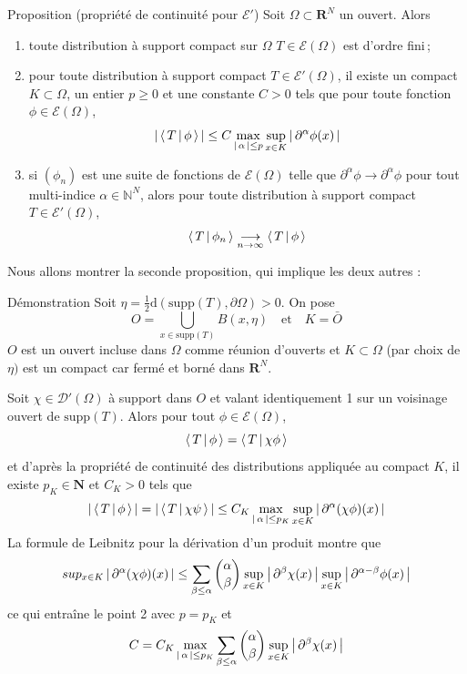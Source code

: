         \begin{omed}{Proposition (propriété de continuité pour $\mathcal{E}'$)}
            Soit $\Omega \subset \mathbf{R}^N$ un ouvert. Alors 
            \begin{enumerate}[label=($p_{\arabic*}$)]
                \item toute distribution à support compact sur $\Omega$ $T \in \mathcal{E}(\Omega)$ est d’ordre fini ;
                \item pour toute distribution à support compact $T \in \mathcal{E}'(\Omega)$, il existe un compact $K \subset \Omega$, un entier $p \geq 0$ et une constante $C > 0$ tels que pour toute fonction $\phi \in \mathcal{E}(\Omega)$, 
                \[ \left\lvert \, \left< \, T \, \middle| \, \phi \, \right> \, \right\rvert \leq C \max_{\left\lvert \, \alpha \, \right\rvert \leq p} \sup_{x \in K} \left\lvert \, \partial^{\alpha} \phi(x) \, \right\rvert \] 
                \item si $(\phi_n)$ est une suite de fonctions de $\mathcal{E}(\Omega)$ telle que $\partial^{\alpha} \phi \to \partial^{\alpha} \phi$ pour tout multi-indice $\alpha \in \mathbb{N}^N$, alors pour toute distribution à support compact $T \in \mathcal{E}'(\Omega)$, 
                \[ \left< \, T \, \middle| \, \phi_n \, \right> \underset{n \to \infty}{\longrightarrow} \left< \, T \, \middle| \, \phi \, \right> \]   
            \end{enumerate}
        \end{omed}

        Nous allons montrer la seconde proposition, qui implique les deux autres : 

        \begin{demo}{Démonstration}
            Soit $\eta = \frac{1}{2} \text{d}\left(\text{supp}(T), \partial \Omega\right) > 0$. On pose 
            \[ O = \bigcup_{x \in \text{supp}(T)} B(x, \eta) \quad \text{et} \quad K = \bar{O} \]   
            $O$ est un ouvert incluse dans $\Omega$ comme réunion d’ouverts et $K \subset \Omega$ (par choix de $\eta)$ est un compact car fermé et borné dans $\mathbf{R}^N$. 

            Soit $\chi \in \mathcal{D}'(\Omega)$ à support dans $O$ et valant identiquement 1 sur un voisinage ouvert de $\text{supp}(T)$. Alors pour tout $\phi \in \mathcal{E}(\Omega)$, 
            \[ \left< \, T \, \middle| \, \phi \, \right> = \left< \, T \, \middle| \, \chi\phi \, \right> \]   
            et d’après la propriété de continuité des distributions appliquée au compact $K$, il existe $p_K \in \mathbf{N}$ et $C_K > 0$ tels que 
            \[ \left\lvert \, \left< \, T \, \middle| \, \phi \, \right> \, \right\rvert = \left\lvert \, \left< \, T \, \middle| \, \chi\psi \, \right> \, \right\rvert \leq C_K \max_{\left\lvert \, \alpha \, \right\rvert \leq p_K} \sup_{x \in K} \left\lvert \, \partial^{\alpha} (\chi\phi)(x) \, \right\rvert \]   
            La formule de Leibnitz pour la dérivation d’un produit montre que 
            \[ sup_{x \in K} \left\lvert \, \partial^{\alpha} (\chi\phi)(x) \, \right\rvert \leq \sum_{\beta \leq \alpha} \binom{\alpha}{\beta} \sup_{x \in K} \left\lvert \, \partial^{\beta} \chi(x) \, \right\rvert \sup_{x \in K} \left\lvert \, \partial^{\alpha - \beta}\phi(x) \, \right\rvert \]   
            ce qui entraîne le point 2 avec $p = p_K$ et 
            \[ C = C_K \max_{\left\lvert \, \alpha \, \right\rvert \leq p_K} \sum_{\beta \leq \alpha} \binom{\alpha}{\beta} \sup_{x \in K} \left\lvert \, \partial^{\beta} \chi(x) \, \right\rvert \]     
        \end{demo}

